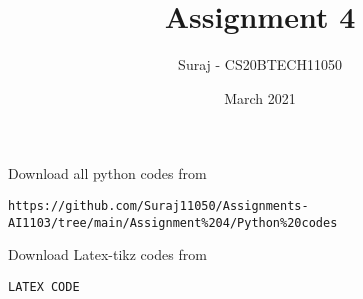 \documentclass[journal,12pt,twocolumn]{IEEEtran}
\date{March 2021}
\DeclareMathOperator*{\Res}{Res}
\begin{document}
\newcommand{\BEQA}{\begin{eqnarray}}
\newcommand{\EEQA}{\end{eqnarray}}
\newcommand{\define}{\stackrel{\triangle}{=}}

\raggedbottom
\setlength{\parindent}{0pt}
\providecommand{\mbf}{\mathbf}
\providecommand{\pr}[1]{\ensuremath{\Pr\left(#1\right)}}
\providecommand{\qfunc}[1]{\ensuremath{Q\left(#1\right)}}
\providecommand{\fn}[1]{\ensuremath{f\left(#1\right)}}
\providecommand{\e}[1]{\ensuremath{E\left(#1\right)}}
\providecommand{\sbrak}[1]{\ensuremath{{}\left[#1\right]}}
\providecommand{\lsbrak}[1]{\ensuremath{{}\left[#1\right.}}
\providecommand{\rsbrak}[1]{\ensuremath{{}\left.#1\right]}}
\providecommand{\brak}[1]{\ensuremath{\left(#1\right)}}
\providecommand{\lbrak}[1]{\ensuremath{\left(#1\right.}}
\providecommand{\rbrak}[1]{\ensuremath{\left.#1\right)}}
\providecommand{\cbrak}[1]{\ensuremath{\left\{#1\right\}}}
\providecommand{\lcbrak}[1]{\ensuremath{\left\{#1\right.}}
\providecommand{\rcbrak}[1]{\ensuremath{\left.#1\right\}}}
\theoremstyle{remark}
\newtheorem{rem}{Remark}
\newcommand{\sgn}{\mathop{\mathrm{sgn}}}
\providecommand{\abs}[1]{\vert#1\vert}
\providecommand{\res}[1]{\Res\displaylimits_{#1}} 
\providecommand{\norm}[1]{\lVert#1\rVert}
\providecommand{\mtx}[1]{\mathbf{#1}}
\providecommand{\mean}[1]{E[ #1 ]}
\providecommand{\fourier}{\overset{\mathcal{F}}{ \rightleftharpoons}}
\providecommand{\system}{\overset{\mathcal{H}}{ \longleftrightarrow}}
\newcommand{\solution}{\noindent \textbf{Solution: }}
\newcommand{\cosec}{\,\text{cosec}\,}
\providecommand{\dec}[2]{\ensuremath{\overset{#1}{\underset{#2}{\gtrless}}}}
\newcommand{\myvec}[1]{\ensuremath{\begin{pmatrix}#1\end{pmatrix}}}
\newcommand{\mydet}[1]{\ensuremath{\begin{vmatrix}#1\end{vmatrix}}}
\makeatletter
\vspace{3cm}
\title{Assignment 4}
\author{Suraj - CS20BTECH11050}
\maketitle
\newpage
\bigskip
\renewcommand{\thetable}{\theenumi}
\newcommand{\dsum}{\displaystyle\sum}
Download all python codes from 
\begin{lstlisting}
https://github.com/Suraj11050/Assignments-AI1103/tree/main/Assignment%204/Python%20codes
\end{lstlisting}
Download Latex-tikz codes from 
%
\begin{lstlisting}
LATEX CODE
\end{lstlisting}
\end{document}
